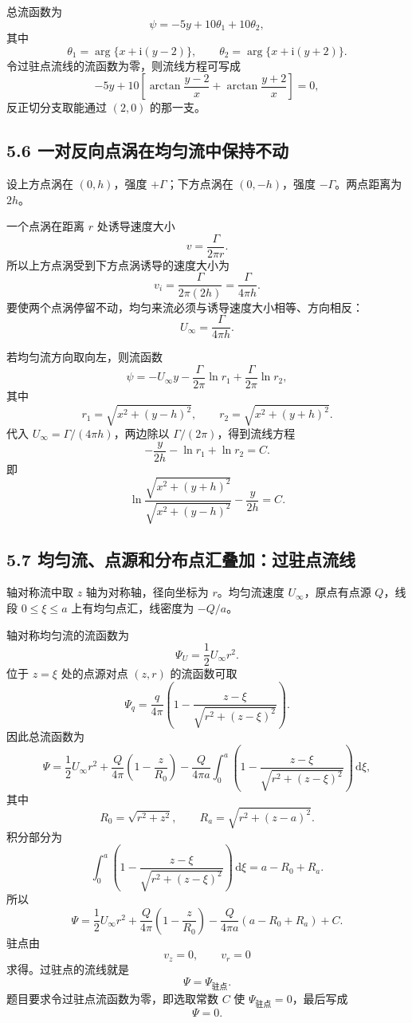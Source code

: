 \documentclass[UTF8,zihao=-4]{ctexart}
\newcommand{\dd}{\,\mathrm d}
\newcommand{\ii}{\mathrm i}
\begin{document}
总流函数为
\[
\psi=-5y+10\theta_1+10\theta_2,
\]
其中
\[
\theta_1=\arg\{x+\ii(y-2)\},\qquad
\theta_2=\arg\{x+\ii(y+2)\}.
\]
令过驻点流线的流函数为零，则流线方程可写成
\[
\boxed{
-5y+10\left[
\arctan\frac{y-2}{x}
+\arctan\frac{y+2}{x}
\right]=0,}
\]
反正切分支取能通过 \((2,0)\) 的那一支。

\subsection*{5.6 一对反向点涡在均匀流中保持不动}

设上方点涡在 \((0,h)\)，强度 \(+\Gamma\)；下方点涡在 \((0,-h)\)，强度 \(-\Gamma\)。两点距离为 \(2h\)。

一个点涡在距离 \(r\) 处诱导速度大小
\[
v=\frac{\Gamma}{2\pi r}.
\]
所以上方点涡受到下方点涡诱导的速度大小为
\[
v_i=\frac{\Gamma}{2\pi(2h)}=\frac{\Gamma}{4\pi h}.
\]
要使两个点涡停留不动，均匀来流必须与诱导速度大小相等、方向相反：
\[
\boxed{U_\infty=\frac{\Gamma}{4\pi h}.}
\]

若均匀流方向取向左，则流函数
\[
\psi=-U_\infty y-\frac{\Gamma}{2\pi}\ln r_1
+\frac{\Gamma}{2\pi}\ln r_2,
\]
其中
\[
r_1=\sqrt{x^2+(y-h)^2},\qquad
r_2=\sqrt{x^2+(y+h)^2}.
\]
代入 \(U_\infty=\Gamma/(4\pi h)\)，两边除以 \(\Gamma/(2\pi)\)，得到流线方程
\[
-\frac{y}{2h}-\ln r_1+\ln r_2=C.
\]
即
\[
\boxed{
\ln\frac{\sqrt{x^2+(y+h)^2}}{\sqrt{x^2+(y-h)^2}}
-\frac{y}{2h}=C.}
\]

\subsection*{5.7 均匀流、点源和分布点汇叠加：过驻点流线}

轴对称流中取 \(z\) 轴为对称轴，径向坐标为 \(r\)。均匀流速度 \(U_\infty\)，原点有点源 \(Q\)，线段 \(0\le \xi\le a\) 上有均匀点汇，线密度为 \(-Q/a\)。

轴对称均匀流的流函数为
\[
\Psi_U=\frac12U_\infty r^2.
\]
位于 \(z=\xi\) 处的点源对点 \((z,r)\) 的流函数可取
\[
\Psi_q=\frac{q}{4\pi}
\left(1-\frac{z-\xi}{\sqrt{r^2+(z-\xi)^2}}\right).
\]
因此总流函数为
\[
\Psi=\frac12U_\infty r^2
+\frac{Q}{4\pi}\left(1-\frac{z}{R_0}\right)
-\frac{Q}{4\pi a}\int_0^a
\left(1-\frac{z-\xi}{\sqrt{r^2+(z-\xi)^2}}\right)\dd\xi,
\]
其中
\[
R_0=\sqrt{r^2+z^2},\qquad R_a=\sqrt{r^2+(z-a)^2}.
\]
积分部分为
\[
\int_0^a
\left(1-\frac{z-\xi}{\sqrt{r^2+(z-\xi)^2}}\right)\dd\xi
=a-R_0+R_a .
\]
所以
\[
\boxed{
\Psi=\frac12U_\infty r^2
+\frac{Q}{4\pi}\left(1-\frac{z}{R_0}\right)
-\frac{Q}{4\pi a}(a-R_0+R_a)+C.}
\]
驻点由
\[
v_z=0,\qquad v_r=0
\]
求得。过驻点的流线就是
\[
\boxed{\Psi=\Psi_{\text{驻点}}.}
\]
题目要求令过驻点流函数为零，即选取常数 \(C\) 使 \(\Psi_{\text{驻点}}=0\)，最后写成
\[
\boxed{\Psi=0.}
\]
\end{document}
